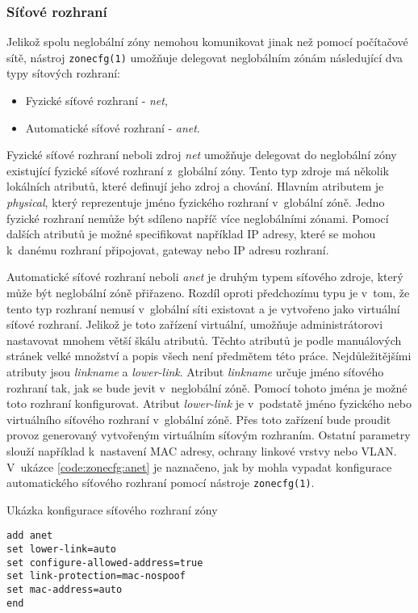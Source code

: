 \subsubsection{Síťové rozhraní}
\label{chapter:zones:configuration:resources:network}
Jelikož spolu neglobální zóny nemohou komunikovat jinak než pomocí počítačové sítě, nástroj \verb|zonecfg(1)| umožňuje delegovat
neglobálním zónám následující dva typy sítových rozhraní:
\begin{itemize}
 \item Fyzické síťové rozhraní - \textit{net},
 \item Automatické síťové rozhraní - \textit{anet}.
\end{itemize}
Fyzické síťové rozhraní neboli zdroj \textit{net} umožňuje delegovat do neglobální zóny existující fyzické síťové rozhraní
z~globální zóny. Tento typ zdroje má několik lokálních atributů, které definují jeho zdroj a chování. Hlavním atributem je
\textit{physical}, který reprezentuje jméno fyzického rozhraní v~globální zóně. Jedno fyzické rozhraní nemůže být sdíleno
napříč více neglobálními zónami. Pomocí dalších atributů je možné specifikovat například IP adresy, které se mohou k~danému 
rozhraní připojovat, gateway nebo IP adresu rozhraní. 

Automatické síťové rozhraní neboli \textit{anet} je druhým typem síťového zdroje, který může být neglobální zóně přiřazeno. Rozdíl
oproti předchozímu typu je v~tom, že tento typ rozhraní nemusí v~globální síti existovat a je vytvořeno jako virtuální síťové
rozhraní. Jelikož je toto zařízení virtuální, umožňuje administrátorovi nastavovat mnohem větší škálu atributů. Těchto
atributů je podle manuálových stránek \cite{oracle:manpages:zonecfg} velké množství a popis všech není předmětem této práce.
Nejdůležitějšími atributy jsou \textit{linkname} a \textit{lower-link}. Atribut \textit{linkname} určuje jméno
síťového rozhraní tak, jak se bude jevit v~neglobální zóně. Pomocí tohoto jména je možné toto rozhraní konfigurovat.
Atribut \textit{lower-link} je v~podstatě jméno fyzického nebo virtuálního síťového rozhraní v~globální zóně.
Přes toto zařízení bude proudit provoz generovaný vytvořeným virtuálním síťovým rozhraním.
Ostatní parametry slouží například k~nastavení MAC adresy, ochrany linkové vrstvy nebo VLAN. V~ukázce 
\ref{code:zonecfg:anet} je naznačeno, jak by mohla vypadat konfigurace automatického síťového rozhraní pomocí nástroje 
\verb|zonecfg(1)|.
\begin{listing}[ht]
  \caption{Ukázka konfigurace síťového rozhraní zóny}
  \label{code:zonecfg:anet}  
  \begin{verbatim}
add anet
set lower-link=auto
set configure-allowed-address=true
set link-protection=mac-nospoof
set mac-address=auto
end   
  \end{verbatim}
\end{listing}
